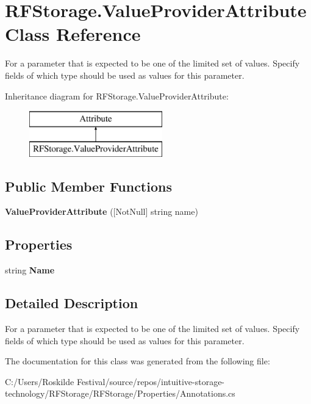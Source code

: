 \section{R\+F\+Storage.\+Value\+Provider\+Attribute Class Reference}
\label{class_r_f_storage_1_1_value_provider_attribute}


For a parameter that is expected to be one of the limited set of values. Specify fields of which type should be used as values for this parameter.  


Inheritance diagram for R\+F\+Storage.\+Value\+Provider\+Attribute\+:\begin{figure}[H]
\begin{center}
\leavevmode
\includegraphics[height=2.000000cm]{class_r_f_storage_1_1_value_provider_attribute}
\end{center}
\end{figure}
\subsection*{Public Member Functions}
\begin{DoxyCompactItemize}
\item 
\mbox{\label{class_r_f_storage_1_1_value_provider_attribute_a6349c186ae9ab018ba7f80c3cdc13886}} 
{\bfseries Value\+Provider\+Attribute} ([Not\+Null] string name)
\end{DoxyCompactItemize}
\subsection*{Properties}
\begin{DoxyCompactItemize}
\item 
\mbox{\label{class_r_f_storage_1_1_value_provider_attribute_a567d385bcc69ded8e020d4371ee729cb}} 
string {\bfseries Name}\hspace{0.3cm}{\ttfamily  [get]}
\end{DoxyCompactItemize}


\subsection{Detailed Description}
For a parameter that is expected to be one of the limited set of values. Specify fields of which type should be used as values for this parameter. 



The documentation for this class was generated from the following file\+:\begin{DoxyCompactItemize}
\item 
C\+:/\+Users/\+Roskilde Festival/source/repos/intuitive-\/storage-\/technology/\+R\+F\+Storage/\+R\+F\+Storage/\+Properties/Annotations.\+cs\end{DoxyCompactItemize}

